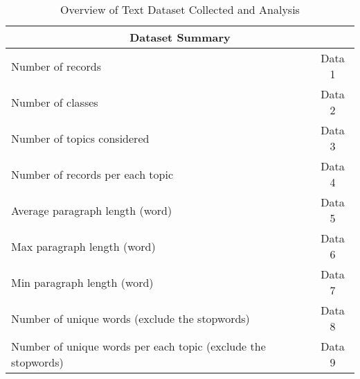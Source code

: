 \documentclass{article}
\begin{document}
\begin{table}[ht]
\centering
\begin{tabular}{|l|c|}
\hline
\multicolumn{2}{|c|}{\textbf{Dataset Summary}} \\ [0.5ex] 
\hline
Number of records & Data 1 \\ 
Number of classes & Data 2 \\ 
Number of topics considered & Data 3 \\ 
Number of records per each topic & Data 4 \\
Average paragraph length (word) & Data 5 \\
Max paragraph length (word) & Data 6 \\
Min paragraph length (word) & Data 7 \\
Number of unique words (exclude the stopwords) & Data 8 \\
Number of unique words per each topic (exclude the stopwords) & Data 9 \\ [1ex] 
\hline
\end{tabular}
\caption{Overview of Text Dataset Collected and Analysis}
\label{table:1}
\end{table}
\end{document}
